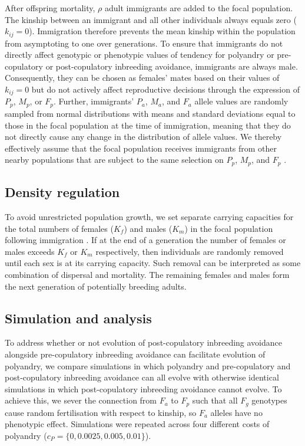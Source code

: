 \documentclass[10pt,letterpaper]{article}
\begin{document}
After offspring mortality, $\rho$ adult immigrants are added to the focal population. The kinship between an immigrant and all other individuals always equals zero ($k_{ij}=0$). Immigration therefore prevents the mean kinship within the population from asymptoting to one over generations. To ensure that immigrants do not directly affect genotypic or phenotypic values of tendency for polyandry or pre-copulatory or post-copulatory inbreeding avoidance, immigrants are always male. Consequently, they can be chosen as females' mates based on their values of $k_{ij}=0$ but do not actively affect reproductive decisions through the expression of $P_{p}$, $M_{p}$, or $F_{p}$. Further, immigrants' $P_{a}$, $M_{a}$, and $F_{a}$ allele values are randomly sampled from normal distributions with means and standard deviations equal to those in the focal population at the time of immigration, meaning that they do not directly cause any change in the distribution of allele values. We thereby effectively assume that the focal population receives immigrants from other nearby populations that are subject to the same selection on $P_{p}$, $M_{p}$, and $F_{p}$ \cite[][]{Duthie, Duthie2016a}.

\subsection*{Density regulation}

To avoid unrestricted population growth, we set separate carrying capacities for the total numbers of females ($K_{f}$) and males ($K_{m}$) in the focal population following immigration \cite[][]{Guillaume2009, Duthie}. If at the end of a generation the number of females or males exceeds $K_{f}$ or $K_{m}$  respectively, then individuals are randomly removed until each sex is at its carrying capacity. Such removal can be interpreted as some combination of dispersal and mortality. The remaining females and males form the next generation of potentially breeding adults.


\subsection*{Simulation and analysis}

To address whether or not evolution of post-copulatory inbreeding avoidance alongside pre-copulatory inbreeding avoidance can facilitate evolution of polyandry, we compare simulations in which polyandry and pre-copulatory and post-copulatory inbreeding avoidance can all evolve with otherwise identical simulations in which post-copulatory inbreeding avoidance cannot evolve. To achieve this, we sever the connection from $F_{a}$ to $F_{p}$ such that all $F_{g}$ genotypes cause random fertilisation with respect to kinship, so $F_{a}$ alleles have no phenotypic effect. Simulations were repeated across four different costs of polyandry ($c_{P} = \{0, 0.0025, 0.005,  0.01\}$).
\end{document}
